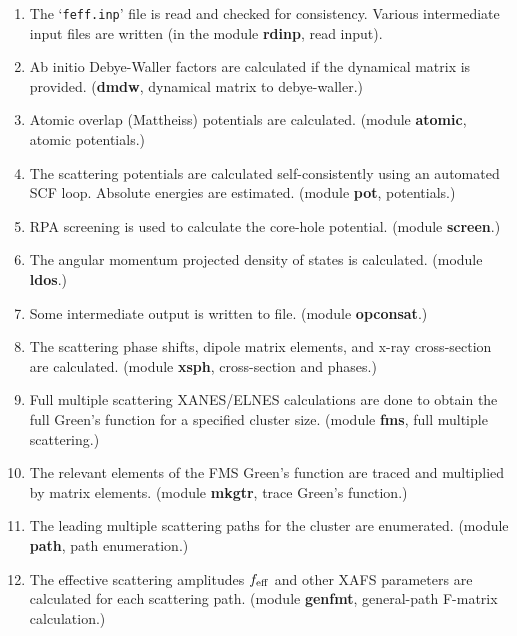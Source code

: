 \documentclass[11pt,oneside]{report} %
\newcommand{\file}[1]{`\texttt{#1}'}
\newcommand{\module}[1]{\textrm{\bf{#1}}}
\begin{document}
\begin{enumerate}

\item The \file{feff.inp} file is read and checked for consistency.
Various intermediate input files are written (in the module 
\module{rdinp}, read input).

\item Ab initio Debye-Waller factors are calculated if the dynamical matrix is provided. (\module{dmdw}, dynamical matrix to debye-waller.)

\item Atomic overlap (Mattheiss) potentials are calculated.
(module \module{atomic}, atomic potentials.)

\item  The scattering potentials are calculated self-consistently using
an automated SCF loop. Absolute energies are estimated.
(module \module{pot}, potentials.)

\item RPA screening is used to calculate the core-hole potential. (module \module{screen}.)

\item  The angular momentum projected density of 
states is calculated. (module \module{ldos}.) 

\item Some intermediate output is written to file. (module \module{opconsat}.)

\item  The scattering phase shifts, dipole matrix
elements, and x-ray cross-section are calculated. 
(module \module{xsph}, cross-section and phases.)

\item  Full multiple scattering XANES/ELNES calculations are
done to obtain the full Green's function for a specified cluster size.
(module \module{fms}, full multiple scattering.)

\item The relevant elements of the FMS Green's function are traced and
multiplied by matrix elements.
(module \module{mkgtr}, trace Green's function.)

\item  The leading multiple scattering paths for the cluster are enumerated.
(module \module{path}, path enumeration.)

\item  The effective scattering amplitudes $f_{\rm eff}$ and other XAFS
parameters are calculated for each scattering path.
(module \module{genfmt}, general-path F-matrix calculation.)


\end{enumerate}
\end{document}
